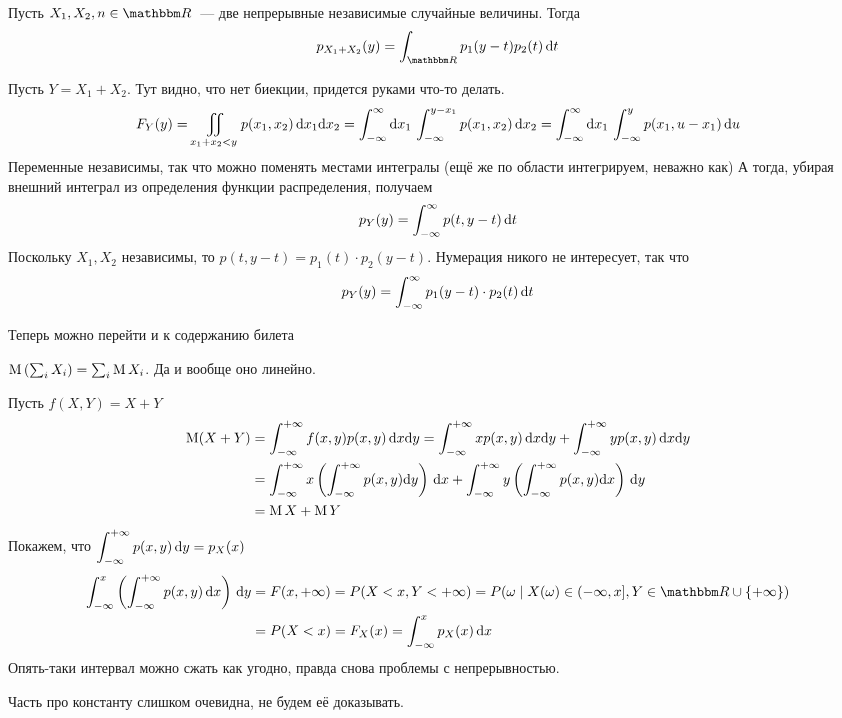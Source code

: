 \documentclass[12pt,timbord]{../../../notes}
\begin{document}
\begin{prop}\label{prop:stat::randsum::contsum}
  Пусть $X_1,X_2,n\in\R$~--- две непрерывные независимые случайные величины. Тогда 
  \[
    p_{X_1+X_2}(y) = \int_{\R} p_1(y-t) p_2(t) \,\del t
  \]
\end{prop}
\begin{itlproof}
  Пусть $Y = X_1 + X_2$. Тут видно, что нет биекции, придется руками что-то делать.
  \[
    F_Y(y) = \displaystyle\iint_{x_1+x_2 < y} p(x_1, x_2) \, \mathrm{d} x_1 \mathrm{d} x_2
    = \int_{-\infty}^\infty \mathrm{d} x_1\, \int_{-\infty}^{y-x_1} p(x_1, x_2) \, \mathrm{d} x_2 
    = \int_{-\infty}^\infty \mathrm{d} x_1 \, \int_{-\infty}^y p(x_1, u - x_1) \, \mathrm{d} u
  \]
  Переменные независимы, так что можно поменять местами интегралы (ещё же по области интегрируем,
  неважно как)
  А тогда, убирая внешний интеграл из определения функции распределения, получаем
  \[
    p_Y(y) = \int_{-\infty}^\infty p(t, y-t)\, \mathrm{d} t
  \]
  Поскольку $X_1, X_2$ независимы, то $p(t, y-t) = p_1(t)\cdot p_2(y-t)$. Нумерация никого не
  интересует, так что
  \[
    p_Y(y) =  \int_{-\infty}^\infty p_1(y-t)\cdot p_2(t)\, \mathrm{d} t
  \]
\end{itlproof}

Теперь можно перейти и к содержанию билета
\begin{prop}\label{prop:stat::randsum::exp}
  $\operatorname{\mathrm M} \left(\sum_i X_i\right) = \sum_i \operatorname{\mathrm M} X_i $. Да и вообще оно линейно.
\end{prop}
\begin{itlproof}
  Пусть $f(X,Y)= X+Y$
  \[
    \begin{split}
      \operatorname{\mathrm M} (X+Y) &= \int_{-\infty}^{+\infty} f(x,y) p(x,y)\, \mathrm{d} x\mathrm{d} y 
      = \int_{-\infty}^{+\infty} x p(x,y)\, \mathrm{d} x \mathrm{d} y + \int_{-\infty}^{+\infty} y p(x,y)\, \mathrm{d} x \mathrm{d} y \\
      &= \int_{-\infty}^{+\infty} x 
      \left(\int_{-\infty}^{+\infty} p(x,y) \mathrm{d} y\right)\, \mathrm{d} x + \int_{-\infty}^{+\infty} y \left(\int_{-\infty}^{+\infty} p(x,y) \mathrm{d} x\right)\,\mathrm{d} y \\
      &= \operatorname{\mathrm M} X + \operatorname{\mathrm M} Y
    \end{split}
  \]
  Покажем, что $\displaystyle\int_{-\infty}^{+\infty} p(x,y) \,\mathrm{d} y = p_X(x)$
  \[
    \begin{split}
      \int_{-\infty}^x \left(\intR p(x,y) \,\del x\right) \, \del y &= F(x, +\infty) = 
      P(X<x, Y<+\infty) = P({\omega\mid X(\omega)\in (-\infty, x], Y\in \R\cup\{+\infty\}}) \\
      &= P(X<x) = F_X(x) = \int_{-\infty}^x p_X(x) \, \del x
    \end{split}
  \]
  Опять-таки интервал можно сжать как угодно, правда снова проблемы с непрерывностью.

  Часть про константу слишком очевидна, не будем её доказывать. 
\end{itlproof}
\end{document}
